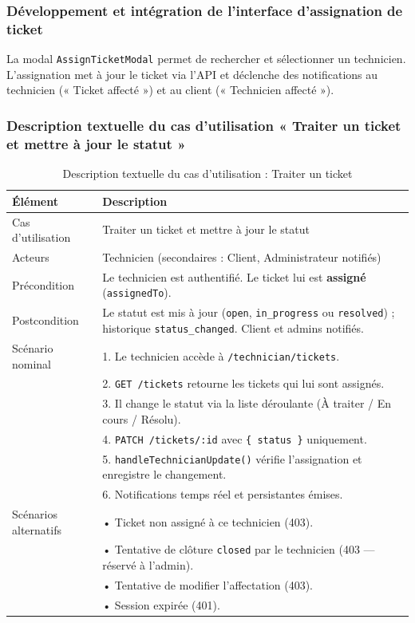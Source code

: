 \subsubsection{Développement et intégration de l'interface d'assignation de ticket}
La modal \texttt{AssignTicketModal} permet de rechercher et sélectionner un technicien. L'assignation met à jour le ticket via l'API et déclenche des notifications au technicien (« Ticket affecté ») et au client (« Technicien affecté »).


\subsubsection{Description textuelle du cas d'utilisation « Traiter un ticket et mettre à jour le statut »}

\begin{table}[H]
\centering
\footnotesize
\renewcommand{\arraystretch}{0.8}
\setlength{\tabcolsep}{4pt}
\begin{tabular}{|p{3cm}|p{9cm}|}
\hline
\textbf{Élément} & \textbf{Description} \\
\hline
Cas d'utilisation & Traiter un ticket et mettre à jour le statut \\
\hline
Acteurs & Technicien (secondaires : Client, Administrateur notifiés) \\
\hline
Précondition & Le technicien est authentifié. Le ticket lui est \textbf{assigné} (\texttt{assignedTo}). \\
\hline
Postcondition & Le statut est mis à jour (\texttt{open}, \texttt{in\_progress} ou \texttt{resolved}) ; historique \texttt{status\_changed}. Client et admins notifiés. \\
\hline
Scénario nominal &
1. Le technicien accède à \texttt{/technician/tickets}.\\
& 2. \texttt{GET /tickets} retourne les tickets qui lui sont assignés.\\
& 3. Il change le statut via la liste déroulante (À traiter / En cours / Résolu).\\
& 4. \texttt{PATCH /tickets/:id} avec \texttt{\{ status \}} uniquement.\\
& 5. \texttt{handleTechnicianUpdate()} vérifie l'assignation et enregistre le changement.\\
& 6. Notifications temps réel et persistantes émises.\\
\hline
Scénarios alternatifs &
• Ticket non assigné à ce technicien (403).\\
& • Tentative de clôture \texttt{closed} par le technicien (403 — réservé à l'admin).\\
& • Tentative de modifier l'affectation (403).\\
& • Session expirée (401).\\
\hline
\end{tabular}
\caption{Description textuelle du cas d'utilisation : Traiter un ticket}
\label{tab:cu-process-ticket}
\end{table}

